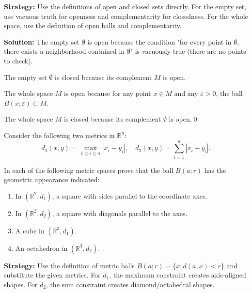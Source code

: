 \noindent\textbf{Strategy:} Use the definitions of open and closed sets directly. For the empty set, use vacuous truth for openness and complementarity for closedness. For the whole space, use the definition of open balls and complementarity.

\noindent\bigskip\noindent\textbf{Solution:} The empty set $\emptyset$ is open because the condition "for every point in $\emptyset$, there exists a neighborhood contained in $\emptyset$" is vacuously true (there are no points to check).

The empty set $\emptyset$ is closed because its complement $M$ is open.

The whole space $M$ is open because for any point $x \in M$ and any $\varepsilon > 0$, the ball $B(x;\varepsilon) \subset M$.

The whole space $M$ is closed because its complement $\emptyset$ is open.\qed


\begin{problembox}
Consider the following two metrics in \( \mathbb{R}^n \):
\[d_1(x, y) = \max_{1 \leq i \leq n} |x_i - y_i|, \quad d_2(x, y) = \sum_{i=1}^n |x_i - y_i|.\]

In each of the following metric spaces prove that the ball \( B(a; r) \) has the geometric appearance indicated:
\begin{enumerate}[label=\alph*)]
\item In \( (\mathbb{R}^2, d_1) \), a square with sides parallel to the coordinate axes.
\item In \( (\mathbb{R}^2, d_2) \), a square with diagonals parallel to the axes.
\item A cube in \( (\mathbb{R}^3, d_1) \).
\item An octahedron in \( (\mathbb{R}^3, d_2) \).
\end{enumerate}
\end{problembox}

\noindent\textbf{Strategy:} Use the definition of metric balls $B(a;r) = \{x : d(a,x) < r\}$ and substitute the given metrics. For $d_1$, the maximum constraint creates axis-aligned shapes. For $d_2$, the sum constraint creates diamond/octahedral shapes.

